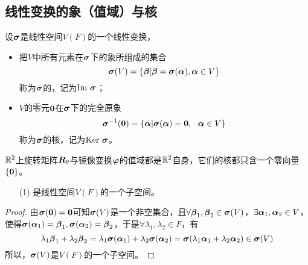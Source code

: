 \subsection{线性变换的象（值域）与核}

\begin{frame}
  \begin{dingyi}
    设$\boldsymbol{\sigma}$是线性空间$V(F)$的一个线性变换，
    \begin{itemize}
      \item 把$V$中所有元素在$\boldsymbol{\sigma}$下的象所组成的集合
        $$
        \boldsymbol{\sigma}(V)=\{\boldsymbol{\beta}|\boldsymbol{\beta}=\boldsymbol{\sigma}(\boldsymbol{\alpha}), \boldsymbol{\alpha}\in V\}
        $$
        称为$\boldsymbol{\sigma}$的，记为$\mathrm{Im~}\boldsymbol{\sigma}$；
      \item
        $V$的零元$\M0$在$\boldsymbol{\sigma}$下的完全原象
        $$
        \sigmabd^{-1}(\M0)=\{\alphabd|\sigmabd(\alphabd)=\M0, ~~\alphabd \in V\}
        $$
        称为$\boldsymbol{\sigma}$的核，记为$\mathrm{Ker~}\boldsymbol{\sigma}$。
      \end{itemize}
  \end{dingyi}
\end{frame}

\begin{frame}
  \begin{li}
    $\mathbb R^2$上旋转矩阵$\boldsymbol{R}_\theta$与镜像变换$\boldsymbol{\varphi}$的值域都是$\mathbb R^2$自身，它们的核都只含一个零向量$\{\M0\}$。
  \end{li}
\end{frame}

\begin{frame}
  \begin{itemize}
  \item[(1)] 是线性空间$V(F)$的一个子空间。   
  \end{itemize} \pause 

  \begin{proof}
    由$\sigmabd(\M0)=\M0$可知$\boldsymbol{\sigma}(V)$是一个非空集合，且$\forall \boldsymbol{\beta}_1,\boldsymbol{\beta}_2\in \boldsymbol{\sigma}(V)$，$\exists \boldsymbol{\alpha}_1,\boldsymbol{\alpha}_2\in V$，使得$\boldsymbol{\sigma}(\boldsymbol{\alpha}_1)=\boldsymbol{\beta}_1,\boldsymbol{\sigma}(\boldsymbol{\alpha}_2)=\boldsymbol{\beta}_2$，于是$\forall \lambda_1,\lambda_2\in F$，有
    $$
    \lambda_1\boldsymbol{\beta}_1+\lambda_2\boldsymbol{\beta}_2=\lambda_1\boldsymbol{\sigma}(\boldsymbol{\alpha}_1)+\lambda_2\boldsymbol{\sigma}(\boldsymbol{\alpha}_2)=\boldsymbol{\sigma}(\lambda_1\boldsymbol{\alpha}_1+\lambda_2\boldsymbol{\alpha}_2)\in \boldsymbol{\sigma}(V)
    $$
    所以，$\boldsymbol{\sigma}(V)$是$V(F)$的一个子空间。
  \end{proof}
\end{frame}

